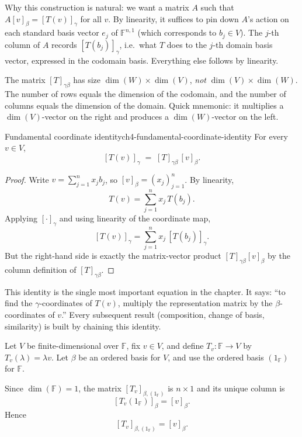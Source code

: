 Why this construction is natural: we want a matrix $A$ such that $A[v]_\beta = [T(v)]_\gamma$ for all $v$.
By linearity, it suffices to pin down $A$'s action on each standard basis vector $e_j$ of $\mathbb{F}^{n,1}$ (which corresponds to $b_j\in V$).
The $j$-th column of $A$ records $[T(b_j)]_\gamma$, i.e.\ what $T$ does to the $j$-th domain basis vector, expressed in the codomain basis.
Everything else follows by linearity.

\begin{examtip}[title={Exam Focus: size check for $[T]_{\gamma\beta}$}]
The matrix $[T]_{\gamma\beta}$ has size $\dim(W)\times\dim(V)$, \emph{not} $\dim(V)\times\dim(W)$.
The number of rows equals the dimension of the codomain, and the number of columns equals the dimension of the domain.
Quick mnemonic: it multiplies a $\dim(V)$-vector on the right and produces a $\dim(W)$-vector on the left.
\end{examtip}

\begin{theorem}{Fundamental coordinate identity}{ch4-fundamental-coordinate-identity}
For every $v\in V$,
\[
[T(v)]_\gamma \;=\; [T]_{\gamma\beta}\,[v]_\beta.
\]
\end{theorem}

\begin{proof}
Write $v=\sum_{j=1}^n x_j b_j$, so $[v]_\beta=(x_j)_{j=1}^n$. By linearity,
\[
T(v)=\sum_{j=1}^n x_j\,T(b_j).
\]
Applying $[\cdot]_\gamma$ and using linearity of the coordinate map,
\[
[T(v)]_\gamma=\sum_{j=1}^n x_j\,[T(b_j)]_\gamma.
\]
But the right-hand side is exactly the matrix-vector product $[T]_{\gamma\beta}[v]_\beta$ by the column definition of $[T]_{\gamma\beta}$.
\end{proof}

This identity is the single most important equation in the chapter.
It says: ``to find the $\gamma$-coordinates of $T(v)$, multiply the representation matrix by the $\beta$-coordinates of $v$.''
Every subsequent result (composition, change of basis, similarity) is built by chaining this identity.

\begin{examplebox}[title={Worked Example (Tutorial 7, Question 1): one-dimensional domain $\Rightarrow$ one column}]
Let $V$ be finite-dimensional over $\mathbb{F}$, fix $v\in V$, and define $T_v:\mathbb{F}\to V$ by $T_v(\lambda)=\lambda v$.
Let $\beta$ be an ordered basis for $V$, and use the ordered basis $(1_\mathbb{F})$ for $\mathbb{F}$.

Since $\dim(\mathbb{F})=1$, the matrix $[T_v]_{\beta,(1_\mathbb{F})}$ is $n\times 1$ and its unique column is
\[
[T_v(1_\mathbb{F})]_\beta=[v]_\beta.
\]
Hence
\[
[T_v]_{\beta,(1_\mathbb{F})}=[v]_\beta.
\]
\end{examplebox}

